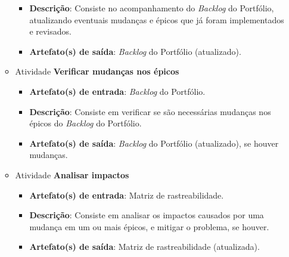 \begin{itemize}
\begin{itemize}
\begin{itemize}
	      \item \textbf{Descrição}: Consiste no acompanhamento do \textit{Backlog} do Portfólio, atualizando eventuais
		mudanças e épicos que já foram implementados e revisados.
	      
	      \item \textbf{Artefato(s) de saída}: \textit{Backlog} do Portfólio (atualizado).
		    
	    \end{itemize}
	    
	 \item Atividade \textbf{Verificar mudanças nos épicos}
	    
	    \begin{itemize}
	      \item \textbf{Artefato(s) de entrada}: \textit{Backlog} do Portfólio.

	      \item \textbf{Descrição}: Consiste em verificar se são necessárias mudanças nos épicos do
		\textit{Backlog} do Portfólio.
	      
	      \item \textbf{Artefato(s) de saída}: \textit{Backlog} do Portfólio (atualizado), se houver mudanças.
		    
	    \end{itemize}
	    
	 \item Atividade \textbf{Analisar impactos}
	    
	    \begin{itemize}
	      \item \textbf{Artefato(s) de entrada}: Matriz de rastreabilidade.

	      \item \textbf{Descrição}: Consiste em analisar os impactos causados por uma mudança em um ou
		mais épicos, e mitigar o problema, se houver.
	      
	      \item \textbf{Artefato(s) de saída}: Matriz de rastreabilidade (atualizada).
		    
	    \end{itemize}
	    
	\end{itemize}
     
    \end{itemize}